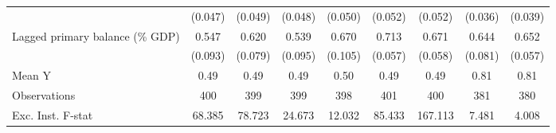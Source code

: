 {\begin{tabular}{l*{8}{c}}
                    &     (0.047)         &     (0.049)         &     (0.048)         &     (0.050)         &     (0.052)         &     (0.052)         &     (0.036)         &     (0.039)         \\
\addlinespace
Lagged primary balance (\% GDP)&       0.547\sym{***}&       0.620\sym{***}&       0.539\sym{***}&       0.670\sym{***}&       0.713\sym{***}&       0.671\sym{***}&       0.644\sym{***}&       0.652\sym{***}\\
                    &     (0.093)         &     (0.079)         &     (0.095)         &     (0.105)         &     (0.057)         &     (0.058)         &     (0.081)         &     (0.057)         \\
\midrule
Mean Y              &        0.49         &        0.49         &        0.49         &        0.50         &        0.49         &        0.49         &        0.81         &        0.81         \\
Observations        &         400         &         399         &         399         &         398         &         401         &         400         &         381         &         380         \\
Exc. Inst. F-stat   &      68.385         &      78.723         &      24.673         &      12.032         &      85.433         &     167.113         &       7.481         &       4.008         \\
\bottomrule
\end{tabular}
}
